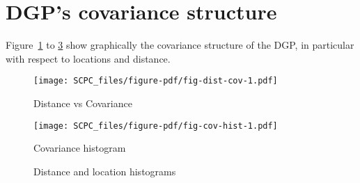 \documentclass[
]{article}
\begin{document}
\hypertarget{dgps-covariance-structure}{%
\section{DGP's covariance structure}\label{dgps-covariance-structure}}

Figure~\ref{fig-dist-cov} to \ref{fig-extras} show graphically the
covariance structure of the DGP, in particular with respect to locations
and distance.

\begin{figure}

{\centering \texttt{[image: SCPC\_files/figure-pdf/fig-dist-cov-1.pdf]}

}

\caption{\label{fig-dist-cov}Distance vs Covariance}

\end{figure}

\begin{figure}

{\centering \texttt{[image: SCPC\_files/figure-pdf/fig-cov-hist-1.pdf]}

}

\caption{\label{fig-cov-hist}Covariance histogram}

\end{figure}

\begin{figure}

\begin{minipage}[t]{0.50\linewidth}

{\centering 


}

\end{minipage}%
%
\begin{minipage}[t]{0.50\linewidth}

{\centering 


}

\end{minipage}%

\caption{\label{fig-extras}Distance and location histograms}

\end{figure}
\end{document}
